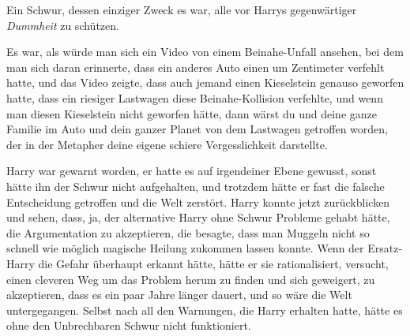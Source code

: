 Ein Schwur, dessen einziger Zweck es war, alle vor Harrys gegenwärtiger \emph{Dummheit} zu schützen.

Es war, als würde man sich ein Video von einem Beinahe-Unfall ansehen, bei dem man sich daran erinnerte, dass ein anderes Auto einen um Zentimeter verfehlt hatte, und das Video zeigte, dass auch jemand einen Kieselstein genauso geworfen hatte, dass ein riesiger Lastwagen diese Beinahe-Kollision verfehlte, und wenn man diesen Kieselstein nicht geworfen hätte, dann wärst du und deine ganze Familie im Auto und dein ganzer Planet von dem Lastwagen getroffen worden, der in der Metapher deine eigene schiere Vergesslichkeit darstellte.

Harry war gewarnt worden, er hatte es auf irgendeiner Ebene gewusst, sonst hätte ihn der Schwur nicht aufgehalten, und trotzdem hätte er fast die falsche Entscheidung getroffen und die Welt zerstört. Harry konnte jetzt zurückblicken und sehen, dass, ja, der alternative Harry ohne Schwur Probleme gehabt hätte, die Argumentation zu akzeptieren, die besagte, dass man Muggeln nicht so schnell wie möglich magische Heilung zukommen lassen konnte.
Wenn der Ersatz-Harry die Gefahr überhaupt erkannt hätte, hätte er sie rationalisiert, versucht, einen cleveren Weg um das Problem herum zu finden und sich geweigert, zu akzeptieren, dass es ein paar Jahre länger dauert, und so wäre die Welt untergegangen. Selbst nach all den Warnungen, die Harry erhalten hatte, hätte es ohne den Unbrechbaren Schwur nicht funktioniert.

